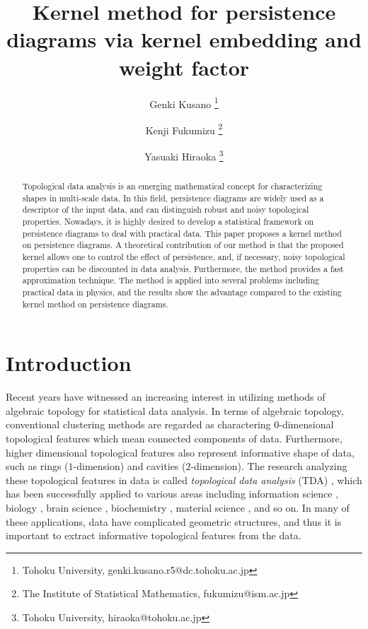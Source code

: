 \documentclass{article}
\title{Kernel method for persistence diagrams via kernel embedding and weight factor}
\author{Genki Kusano \thanks{Tohoku University, genki.kusano.r5@dc.tohoku.ac.jp}
\and Kenji Fukumizu \thanks{The Institute of Statistical Mathematics, fukumizu@ism.ac.jp}
\and Yasuaki Hiraoka \thanks{Tohoku University, hiraoka@tohoku.ac.jp}}
\date{}
\begin{document}
\maketitle




\begin{abstract}

Topological data analysis is an emerging mathematical concept for characterizing shapes in multi-scale data. In this field, persistence diagrams are widely used as a descriptor of the input data, and can distinguish robust and noisy topological properties.  
Nowadays, it is highly desired to develop a statistical framework on persistence diagrams to deal with practical data. 
This paper proposes a kernel method on persistence diagrams. 
A theoretical contribution of our method is that the proposed kernel allows one to control the effect of persistence, and, if necessary, noisy topological properties can be discounted in data analysis. 
Furthermore, the method provides a fast approximation technique. The method is applied into several problems including practical data in physics, and the results show the advantage compared to the existing kernel method on persistence diagrams.
\end{abstract}

\section{Introduction}
\label{sec:intro}

Recent years have witnessed an increasing interest in utilizing methods of algebraic topology for statistical data analysis.
In terms of algebraic topology, conventional clustering methods are regarded as charactering $0$-dimensional topological features which mean connected components of data.
Furthermore, higher dimensional topological features also represent informative shape of data, such as rings ($1$-dimension) and cavities ($2$-dimension).
The research analyzing these topological features in data is called {\em topological data analysis} (TDA) \cite{Ca09}, which has been successfully applied to various areas including information science \cite{CIdSZ08,dSG07}, biology \cite{KZPSGP07,XW14}, brain science \cite{LCKKL11,PETCNHV14,SMISCR08}, biochemistry \cite{GHIKMN13}, material science \cite{HNHEMN16, NHHEN15, STRFH17}, and so on.
In many of these applications, data have complicated geometric structures, and thus it is important to extract informative topological features from the data.
\end{document}
